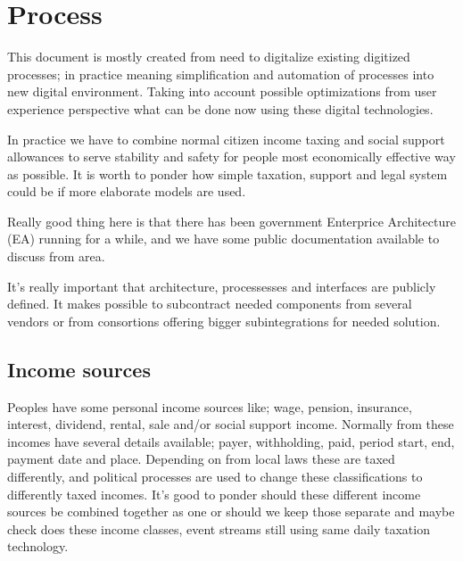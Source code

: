 %
%
%
\chapter{Process}
\label{process}
This document is mostly created from need to digitalize existing digitized
processes; in practice meaning simplification and automation of processes into
new digital environment. Taking into account possible optimizations from user
experience perspective what can be done now using these digital technologies.

In practice we have to combine normal citizen income taxing and social support
allowances to serve stability and safety for people most economically effective
way as possible. It is worth to ponder how simple taxation, support and legal
system could be if more elaborate models are used. 

Really good thing here is that there has been government Enterprice
Architecture (EA) running for a while, and we have some public documentation
available to discuss from area.

It's really important that architecture,
processesses and interfaces are publicly defined. It makes possible to
subcontract needed components from several vendors or from consortions offering
bigger subintegrations for needed solution.


\section{Income sources}
\label{income_sources}
Peoples have some personal income sources like; wage, pension, insurance,
interest, dividend, rental, sale and/or social support income.
Normally from these incomes have several details available;
payer, withholding, paid, period start, end, payment date and place.
Depending on from local laws these are taxed differently,
and political processes are used to change these classifications to differently taxed incomes.
It's good to ponder should these different income sources be combined together as one
or should we keep those separate and maybe check does these income classes,
event streams still using same daily taxation technology.

